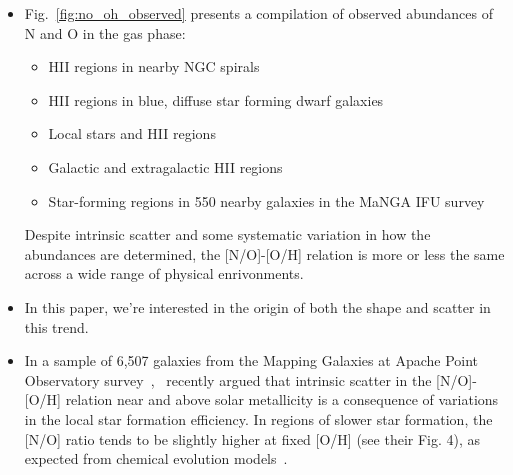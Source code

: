 \documentclass[ms.tex]{subfiles}
\begin{document}
\begin{itemize} 
	\item Fig.~\ref{fig:no_oh_observed} presents a compilation of observed 
	abundances of N and O in the gas phase: 
	\begin{itemize} 
		\item HII regions in nearby NGC spirals~\citep{Pilyugin2010} 

		\item HII regions in blue, diffuse star forming dwarf 
		galaxies~\citep{Berg2012, Izotov2012, James2015} 

		\item Local stars and HII regions~\citep{Dopita2016} 

		\item Galactic and extragalactic HII regions~\citep{Henry2000} 

		\item Star-forming regions in 550 nearby galaxies in the MaNGA IFU 
		survey~\citep{Belfiore2017} 
	\end{itemize} 
	Despite intrinsic scatter and some systematic variation in how the 
	abundances are determined, the [N/O]-[O/H] relation is more or less the 
	same across a wide range of physical enrivonments. 

	\item In this paper, we're interested in the origin of both the shape and 
	scatter in this trend. 

	\item In a sample of 6,507 galaxies from the Mapping Galaxies at Apache 
	Point Observatory survey~\citep[MaNGA;][]{Bundy2015},~\citet{Schaefer2020} 
	recently argued that intrinsic scatter in the [N/O]-[O/H] relation 
	near and above solar metallicity is a consequence of variations in the 
	local star formation efficiency. In regions of slower star formation, the 
	[N/O] ratio tends to be slightly higher at fixed [O/H] (see their Fig. 4), 
	as expected from chemical evolution models~\citep[e.g.][]{Molla2006, 
	Vincenzo2016}. 
\end{itemize} 
\end{document}

